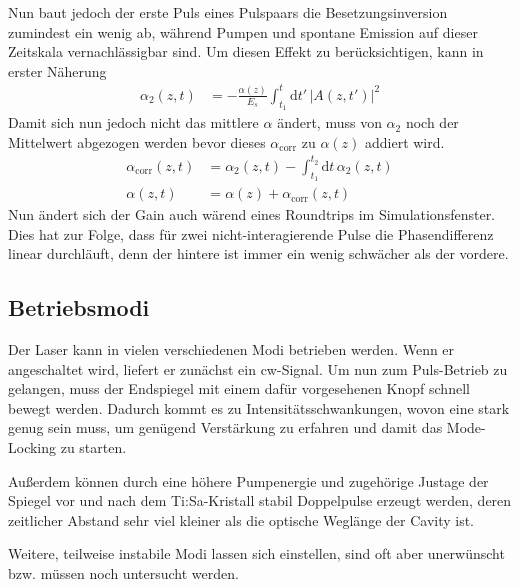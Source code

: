 \documentclass[bachelor,       %
               twoside,        %
               BCOR10mm,       %
               english,ngerman, %
               ]{GAUBM}
\newcommand{\dif}{\ensuremath{\mathrm{d}}}
\begin{document}
Nun baut jedoch der erste Puls eines Pulspaars die Besetzungsinversion zumindest ein wenig ab, während Pumpen und spontane Emission auf dieser Zeitskala vernachlässigbar sind.
Um diesen Effekt zu berücksichtigen, kann in erster Näherung
\begin{align}
	\alpha_2(z,t)&=-\frac{\alpha(z)}{E_s}\int_{t_1}^{t} \dif t'\, |A(z,t')|^2
\end{align}
Damit sich nun jedoch nicht das mittlere $\alpha$ ändert, muss von $\alpha_2$ noch der Mittelwert abgezogen werden bevor dieses $\alpha_\text{corr}$ zu $\alpha(z)$ addiert wird.
\begin{align}
	\alpha_\text{corr}(z,t)&=\alpha_2(z,t)-\int_{t_1}^{t_2} \dif t\, \alpha_2(z,t)\\
	\alpha(z,t)&=\alpha(z)+\alpha_\text{corr}(z,t)
\end{align}
Nun ändert sich der Gain auch wärend eines Roundtrips im Simulationsfenster.
Dies hat zur Folge, dass für zwei nicht-interagierende Pulse die Phasendifferenz linear durchläuft, denn der hintere ist immer ein wenig schwächer als der vordere.  

\subsection{Betriebsmodi}
Der Laser kann in vielen verschiedenen Modi betrieben werden.
Wenn er angeschaltet wird, liefert er zunächst ein cw-Signal.
Um nun zum Puls-Betrieb zu gelangen, muss der Endspiegel mit einem dafür vorgesehenen Knopf schnell bewegt werden.
Dadurch kommt es zu Intensitätsschwankungen, wovon eine stark genug sein muss, um genügend Verstärkung zu erfahren und damit das Mode-Locking zu starten.

Außerdem können durch eine höhere Pumpenergie und zugehörige Justage der Spiegel vor und nach dem Ti:Sa-Kristall stabil Doppelpulse erzeugt werden, deren zeitlicher Abstand sehr viel kleiner als die optische Weglänge der Cavity ist.

Weitere, teilweise instabile Modi lassen sich einstellen, sind oft aber unerwünscht bzw. müssen noch untersucht werden.
\end{document}
